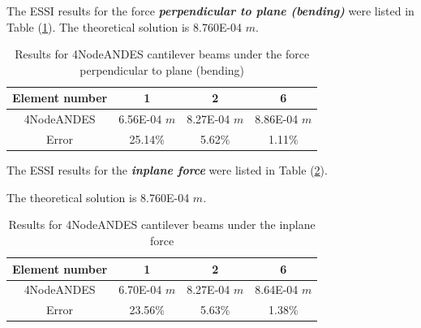 \documentclass[fleqn,11pt,letter]{article}
\begin{document}




The ESSI results for the force \textbf{\emph{perpendicular to plane (bending)}} were listed in Table (\ref{table 4NodeANDES cantilever beams results for different element number}). 
The theoretical solution is 8.760E-04 $m$.
\begin{table}[H]
  \centering
    \captionsetup{justification=centering,margin=2cm}
      \caption{Results for 4NodeANDES cantilever beams under the force perpendicular to plane (bending)}
    \label{table 4NodeANDES cantilever beams results for different element number}
    \begin{tabular}{|c|c|c|c|}
      \hline
      Element number & 1        & 2        & 6         \\  \hline
      4NodeANDES     & 6.56E-04 $m$ & 8.27E-04 $m$ & 8.86E-04 $m$     \\ \hline
      Error          & 25.14\%  & 5.62\%   & 1.11\%     \\ 
      \hline 
    \end{tabular}
\end{table}
The ESSI results for the \textbf{\emph{inplane force}} were listed in Table (\ref{table 4NodeANDES cantilever beams results for different element number 2}). 

The theoretical solution is 8.760E-04 $m$.


\begin{table}[H]
  \centering
      \captionsetup{justification=centering,margin=2cm}
      \caption{Results for 4NodeANDES cantilever beams under the inplane force}
    \label{table 4NodeANDES cantilever beams results for different element number 2}
    \begin{tabular}{|c|c|c|c|}
      \hline
      Element number & 1        & 2        & 6         \\  \hline
      4NodeANDES     &6.70E-04 $m$& 8.27E-04 $m$& 8.64E-04 $m$     \\ \hline
      Error          &  23.56\%  & 5.63\%   & 1.38\%          \\ 
      \hline 
    \end{tabular}
\end{table}
\end{document}
